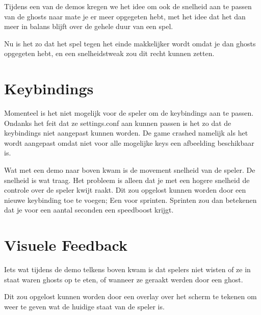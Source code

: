 \documentclass{report}
\begin{document}
  Tijdens een van de demos kregen we het idee om ook de snelheid aan te passen van de ghosts naar mate je er meer opgegeten hebt, met het idee dat het dan meer in balans blijft over de gehele duur van een spel.

  Nu is het zo dat het spel tegen het einde makkelijker wordt omdat je dan ghosts opgegeten hebt, en een snelheidstweak zou dit recht kunnen zetten.

  \section{Keybindings}
  Momenteel is het niet mogelijk voor de speler om de keybindings aan te passen. Ondanks het feit dat ze settings.conf aan kunnen passen is het zo dat de keybindings niet aangepast kunnen worden. De game crashed namelijk als het wordt aangepast omdat niet voor alle mogelijke keys een afbeelding beschikbaar is.

  Wat met een demo naar boven kwam is de movement snelheid van de speler. De snelheid is wat traag. Het probleem is alleen dat je met een hogere snelheid de controle over de speler kwijt raakt. Dit zou opgelost kunnen worden door een nieuwe keybinding toe te voegen; Een voor sprinten. Sprinten zou dan betekenen dat je voor een aantal seconden een speedboost krijgt.

  \section{Visuele Feedback}
  Iets wat tijdens de demo telkens boven kwam is dat spelers niet wisten of ze in staat waren ghosts op te eten, of wanneer ze geraakt werden door een ghost.

  Dit zou opgelost kunnen worden door een overlay over het scherm te tekenen om weer te geven wat de huidige staat van de speler is.
\end{document}
